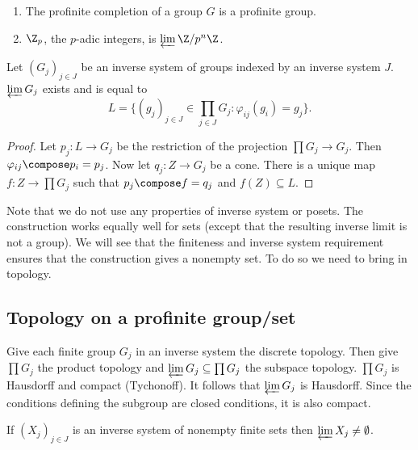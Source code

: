 \documentclass[a4paper]{article}
\begin{document}
\begin{eg}\leavevmode
  \begin{enumerate}
  \item The profinite completion of a group \(G\) is a profinite group.
  \item \(\Z_p\), the \(p\)-adic integers, is \(\varprojlim \Z/p^n\Z\).
  \end{enumerate}
\end{eg}

\begin{proposition}
  Let \((G_j)_{j \in J}\) be an inverse system of groups indexed by an inverse system \(J\). \(\varprojlim G_j\) exists and is equal to
  \[
    L = \{ (g_j)_{j \in J} \in \prod_{j \in J} G_j: \varphi_{ij} (g_i) = g_j \}.
  \]
\end{proposition}

\begin{proof}
  Let \(p_j: L \to G_j\) be the restriction of the projection \(\prod G_j \to G_j\). Then \(\varphi_{ij} \compose p_i = p_j\). Now let \(q_j: Z \to G_j\) be a cone. There is a unique map \(f: Z \to \prod G_j\) such that \(p_j \compose f = q_j\) and \(f(Z) \subseteq L\).
\end{proof}

Note that we do not use any properties of inverse system or posets. The construction works equally well for sets (except that the resulting inverse limit is not a group). We will see that the finiteness and inverse system requirement ensures that the construction gives a nonempty set. To do so we need to bring in topology.

\subsection{Topology on a profinite group/set}

Give each finite group \(G_j\) in an inverse system the discrete topology. Then give \(\prod G_j\) the product topology and \(\varprojlim G_j \subseteq \prod G_j\) the subspace topology. \(\prod G_j\) is Hausdorff and compact (Tychonoff). It follows that \(\varprojlim G_j\) is Hausdorff. Since the conditions defining the subgroup are closed conditions, it is also compact.

\begin{proposition}
  If \((X_j)_{j \in J}\) is an inverse system of nonempty finite sets then \(\varprojlim X_j \ne \emptyset\).
\end{proposition}
\end{document}
